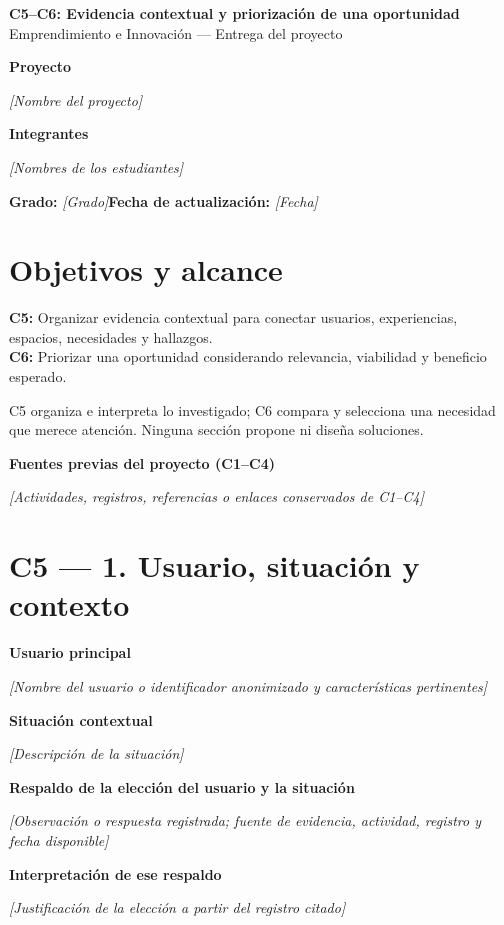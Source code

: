 \documentclass[12pt,a4paper]{article}
\newcommand{\campo}[1]{\textcolor{InstructionColor}{\textit{[#1]}}}
\newcommand{\concept}[1]{\textcolor{ConceptColor}{\textbf{#1}}}
\newcommand{\respuesta}[2]{\par\textbf{#1}\par\campo{#2}\par}
\begin{document}
\raggedbottom
\begin{center}
{\Large\bfseries\color{HeadingColor} C5--C6: Evidencia contextual y priorización de una oportunidad}\\[3pt]
Emprendimiento e Innovación --- Entrega del proyecto
\end{center}
\respuesta{Proyecto}{Nombre del proyecto}
\respuesta{Integrantes}{Nombres de los estudiantes}
\textbf{Grado:} \campo{Grado}\hfill\textbf{Fecha de actualización:} \campo{Fecha}

\section*{Objetivos y alcance}
\concept{C5:} Organizar evidencia contextual para conectar usuarios, experiencias, espacios, necesidades y hallazgos.\\
\concept{C6:} Priorizar una oportunidad considerando relevancia, viabilidad y beneficio esperado.

C5 organiza e interpreta lo investigado; C6 compara y selecciona una necesidad que merece atención. Ninguna sección propone ni diseña soluciones.
\respuesta{Fuentes previas del proyecto (C1--C4)}{Actividades, registros, referencias o enlaces conservados de C1--C4}

\section*{C5 --- 1. Usuario, situación y contexto}
\respuesta{Usuario principal}{Nombre del usuario o identificador anonimizado y características pertinentes}
\respuesta{Situación contextual}{Descripción de la situación}
\respuesta{Respaldo de la elección del usuario y la situación}{Observación o respuesta registrada; fuente de evidencia, actividad, registro y fecha disponible}
\respuesta{Interpretación de ese respaldo}{Justificación de la elección a partir del registro citado}
\end{document}
